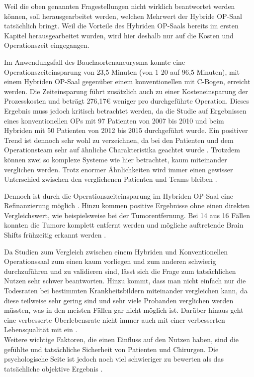 Weil die oben genannten Fragestellungen nicht wirklich beantwortet werden können, soll herausgearbeitet werden, welchen Mehrwert der Hybride OP-Saal tatsächlich bringt. Weil die Vorteile des Hybriden OP-Saals bereits im ersten Kapitel herausgearbeitet wurden, wird hier deshalb nur auf die Kosten und Operationszeit eingegangen.

Im Anwendungsfall des Bauchaortenaneurysma konnte eine Operationszeiteinsparung von 23,5 Minuten (von 1
20 auf 96,5 Minuten), mit einem Hybriden OP-Saal gegenüber einem konventionellen mit C-Bogen, erreicht werden. Die Zeiteinsparung führt zusätzlich auch zu einer Kosteneinsparung der Prozesskosten und beträgt 276,17€ weniger pro durchgeführte Operation.
Dieses Ergebnis muss jedoch kritisch betrachtet werden, da die Studie auf Ergebnissen eines konventionellen OPs mit 97 Patienten von 2007 bis 2010 und beim Hybriden mit 50 Patienten von 2012 bis 2015 durchgeführt wurde. Ein positiver Trend ist dennoch sehr wohl zu verzeichnen, da bei den Patienten und dem Operationsteam sehr auf  ähnliche Charakteristika geachtet wurde \cite{HybriderVsKonventioneller}.
Trotzdem können zwei so komplexe Systeme wie hier betrachtet, kaum miteinander verglichen werden. Trotz enormer Ähnlichkeiten wird immer einen gewisser Unterschied zwischen den verglichenen Patienten und Teams bleiben \cite{DerDigitaleOperationssaal}.

Dennoch ist durch die Operationszeiteinsparung im Hybriden OP-Saal eine Refinanzierung möglich \cite{HybriderVsKonventioneller}. Hinzu kommen positive Ergebnisse ohne einen direkten Vergleichswert, wie beispielsweise bei der Tumorentfernung. Bei 14 aus 16 Fällen konnten die Tumore komplett entfernt werden und mögliche auftretende Brain Shifts frühzeitig erkannt werden \cite{BrainShiftInTumorResection}.

Da Studien zum Vergleich zwischen einem Hybriden und Konventionellen Operationssaal zum einen kaum vorliegen und zum anderen schwierig durchzuführen und zu validieren sind, lässt sich die Frage zum tatsächlichen Nutzen sehr schwer beantworten. Hinzu kommt, dass man nicht einfach nur die Todesraten bei bestimmten Krankheitsbildern miteinander vergleichen kann, da diese teilweise sehr gering sind und sehr viele Probanden verglichen werden müssten, was in den meisten Fällen gar nicht möglich ist. Darüber hinaus geht eine verbesserte Überlebensrate nicht immer auch mit einer verbesserten Lebensqualität mit ein \cite{HybriderVsKonventioneller}. \\
Weitere wichtige Faktoren, die einen Einfluss auf den Nutzen haben, sind die gefühlte und tatsächliche Sicherheit von Patienten und Chirurgen. Die psychologische Seite ist jedoch noch viel schwieriger zu bewerten als das tatsächliche objektive Ergebnis \cite{DerDigitaleOperationssaal}.

